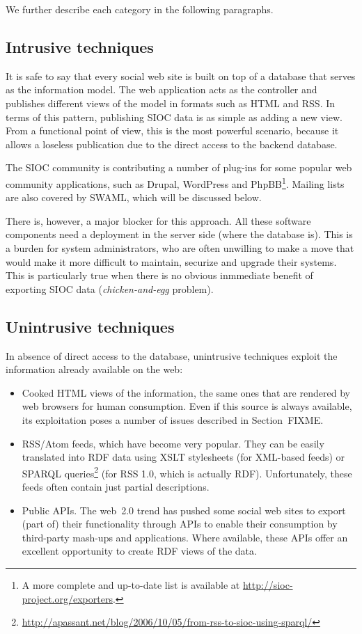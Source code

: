 \documentclass{../templates/www2008-submission}
\begin{document}
We further describe each category in the following paragraphs.

\subsection{Intrusive techniques}

It is safe to say that every social web site is built on top of a
database that serves as the information model. The web application
acts as the controller and publishes different views of the model in
formats such as HTML and RSS. In terms of this pattern, publishing
SIOC data is as simple as adding a new view.
From a functional point of view, this is the most powerful scenario, because
it allows a loseless publication due to the direct access
to the backend database.

The SIOC community is contributing a number of plug-ins for some
popular web community applications, such as Drupal, WordPress and 
PhpBB\footnote{A more complete and up-to-date list is available
at \url{http://sioc-project.org/exporters}.}. Mailing lists are
also covered by SWAML, which will be discussed below.

There is, however, a major blocker for this approach. All these
software components need a deployment in the server side (where
the database is). This is a burden for system administrators, who
are often unwilling to make a move that would make it more difficult to
maintain, securize and upgrade their systems. This is particularly
true when there is no obvious inmmediate benefit of exporting
SIOC data (\emph{chicken-and-egg} problem).

\subsection{Unintrusive techniques}

In absence of direct access to the database, unintrusive
techniques exploit the information already available on the web:

\begin{itemize}

\item Cooked HTML views of the information, the same ones that
are rendered by web browsers for human consumption.
Even if this source is always available,
its exploitation poses a number of issues described in Section~FIXME.

\item RSS/Atom feeds, which have become very popular. They can be easily
translated into RDF data using XSLT stylesheets (for XML-based feeds) or SPARQL queries\footnote{\url{http://apassant.net/blog/2006/10/05/from-rss-to-sioc-using-sparql/}}
(for RSS 1.0, which is actually RDF). Unfortunately,
these feeds often contain just partial descriptions.

\item Public APIs. The web~2.0 trend has pushed some social web
sites to export (part of) their functionality through APIs
to enable their consumption by third-party mash-ups and applications.
Where available, these APIs offer an excellent opportunity to
create RDF views of the data.

\end{itemize}
\end{document}
